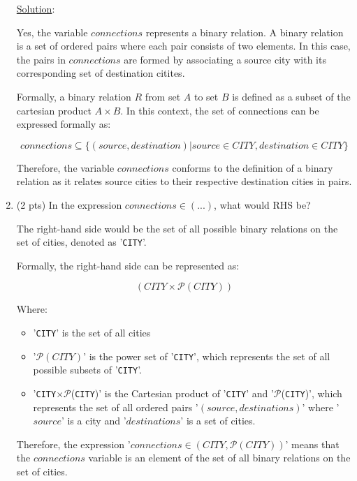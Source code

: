 \documentclass[12pt]{article}
\begin{document}
\begin{spacing}{1.5}
\begin{enumerate}
        \noindent \underline{Solution}:

		      Yes, the variable $connections$ represents a binary relation. A binary relation is a set of ordered pairs where each pair consists of two elements. In this case, the pairs in $connections$ are formed by associating a source city with its corresponding set of destination citites.
		      
		      Formally, a binary relation $R$ from set $A$ to set $B$ is defined as a subset of the cartesian product $A\times B$. In this context, the set of connections can be expressed formally as:
		      
		      $$connections \subseteq \{(source, destination) | source \in CITY, destination \in CITY\}$$
		      
		      Therefore, the variable $connections$ conforms to the definition of a binary relation as it relates source cities to their respective destination cities in pairs.
		          
		\item (2 pts) In the expression $connections \in (...)$, what would RHS be?
		      
		      The right-hand side would be the set of all possible binary relations on the set of cities, denoted as '\texttt{CITY}'.
		      
		      Formally, the right-hand side can be represented as:
		      
		      $$(CITY \times \mathcal{P}(CITY))$$
		      
		      Where:
		      \begin{itemize}
		      	\item '\texttt{CITY}' is the set of all cities
		      	\item '$\mathcal{P}(CITY)$' is the power set of '\texttt{CITY}', which represents the set of all possible subsets of '\texttt{CITY}'.
		      	\item '\texttt{CITY}$\times \mathcal{P}$(\texttt{CITY})' is the Cartesian product of '\texttt{CITY}' and '$\mathcal{P}$(\texttt{CITY})', which represents the set of all ordered pairs '$(source, destinations)$' where '$source$' is a city and '$destinations$' is a set of cities.
		      \end{itemize}
		      
		      Therefore, the expression '$connections \in (CITY, \mathcal{P}(CITY))$' means that the $connections$ variable is an element of the set of all binary relations on the set of cities.
		      

\end{enumerate}
\end{spacing}
\end{document}
